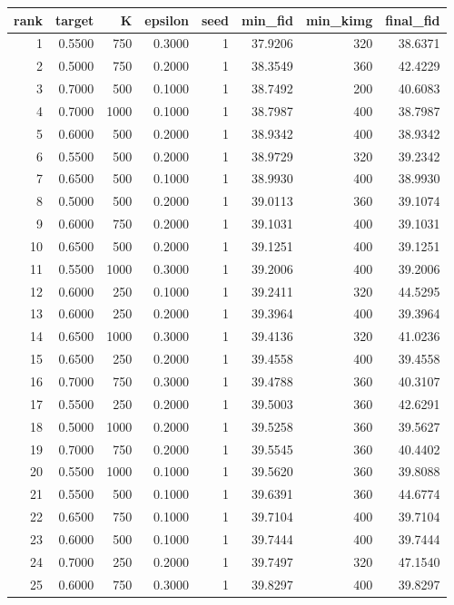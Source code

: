 \begin{tabular}{rrrrrrrr}
\toprule
rank & target & K & epsilon & seed & min_fid & min_kimg & final_fid \\
\midrule
1 & 0.5500 & 750 & 0.3000 & 1 & 37.9206 & 320 & 38.6371 \\
2 & 0.5000 & 750 & 0.2000 & 1 & 38.3549 & 360 & 42.4229 \\
3 & 0.7000 & 500 & 0.1000 & 1 & 38.7492 & 200 & 40.6083 \\
4 & 0.7000 & 1000 & 0.1000 & 1 & 38.7987 & 400 & 38.7987 \\
5 & 0.6000 & 500 & 0.2000 & 1 & 38.9342 & 400 & 38.9342 \\
6 & 0.5500 & 500 & 0.2000 & 1 & 38.9729 & 320 & 39.2342 \\
7 & 0.6500 & 500 & 0.1000 & 1 & 38.9930 & 400 & 38.9930 \\
8 & 0.5000 & 500 & 0.2000 & 1 & 39.0113 & 360 & 39.1074 \\
9 & 0.6000 & 750 & 0.2000 & 1 & 39.1031 & 400 & 39.1031 \\
10 & 0.6500 & 500 & 0.2000 & 1 & 39.1251 & 400 & 39.1251 \\
11 & 0.5500 & 1000 & 0.3000 & 1 & 39.2006 & 400 & 39.2006 \\
12 & 0.6000 & 250 & 0.1000 & 1 & 39.2411 & 320 & 44.5295 \\
13 & 0.6000 & 250 & 0.2000 & 1 & 39.3964 & 400 & 39.3964 \\
14 & 0.6500 & 1000 & 0.3000 & 1 & 39.4136 & 320 & 41.0236 \\
15 & 0.6500 & 250 & 0.2000 & 1 & 39.4558 & 400 & 39.4558 \\
16 & 0.7000 & 750 & 0.3000 & 1 & 39.4788 & 360 & 40.3107 \\
17 & 0.5500 & 250 & 0.2000 & 1 & 39.5003 & 360 & 42.6291 \\
18 & 0.5000 & 1000 & 0.2000 & 1 & 39.5258 & 360 & 39.5627 \\
19 & 0.7000 & 750 & 0.2000 & 1 & 39.5545 & 360 & 40.4402 \\
20 & 0.5500 & 1000 & 0.1000 & 1 & 39.5620 & 360 & 39.8088 \\
21 & 0.5500 & 500 & 0.1000 & 1 & 39.6391 & 360 & 44.6774 \\
22 & 0.6500 & 750 & 0.1000 & 1 & 39.7104 & 400 & 39.7104 \\
23 & 0.6000 & 500 & 0.1000 & 1 & 39.7444 & 400 & 39.7444 \\
24 & 0.7000 & 250 & 0.2000 & 1 & 39.7497 & 320 & 47.1540 \\
25 & 0.6000 & 750 & 0.3000 & 1 & 39.8297 & 400 & 39.8297 \\

\end{tabular}
